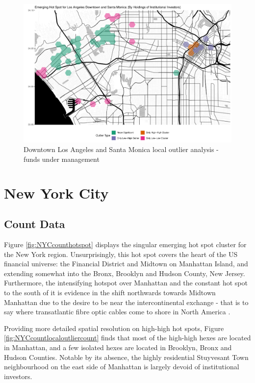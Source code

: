\begin{figure}
	\centering
	\includegraphics[width=1\linewidth]{Figures/ChapterIV/LA_Money_LO_Downtown}
	\caption[Downtown Los Angeles and Santa Monica Local Outlier Analysis - Funds Under Management 2013-2018]{Downtown Los Angeles and Santa Monica local outlier analysis - funds under management}
	\label{fig:LAlocaloutlier_Downtown}
\end{figure}

\section{New York City}

\subsection{Count Data}

Figure \ref{fig:NYCcounthotspot} displays the singular emerging hot spot cluster for the New York region.  Unsurprisingly, this hot spot covers the heart of the US financial universe: the Financial District and Midtown on Manhattan Island, and extending somewhat into the Bronx, Brooklyn and Hudson County, New Jersey.   Furthermore, the intensifying hotspot over Manhattan and the constant hot spot to the south of it is evidence in the shift northwards towards Midtown Manhattan due to the desire to be near the intercontinental exchange - that is to say where transatlantic fibre optic cables come to shore in North America \cite{Administration1989}.    

Providing more detailed spatial resolution on high-high hot spots, Figure \ref{fig:NYCcountlocaloutliercount} finds that most of the high-high hexes are located in Manhattan, and a few isolated hexes are located in Brooklyn, Bronx and Hudson Counties.  Notable by its absence, the highly residential Stuyvesant Town neighbourhood on the east side of Manhattan is largely devoid of institutional investors.      



